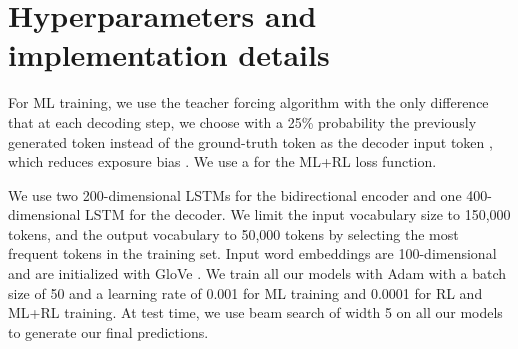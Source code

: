 \documentclass{article} \usepackage{iclr2018_arxiv,times}
\begin{document}
\section{Hyperparameters and implementation details}

For ML training, we use the teacher forcing algorithm with the only difference that at each decoding step, we choose with a 25\% probability the previously generated token instead of the ground-truth token as the decoder input token , which reduces exposure bias \citep{venkatraman2015}. We use a  for the ML+RL loss function.

We use two 200-dimensional LSTMs for the bidirectional encoder and one 400-dimensional LSTM for the decoder. We limit the input vocabulary size to 150,000 tokens, and the output vocabulary to 50,000 tokens by selecting the most frequent tokens in the training set. Input word embeddings are 100-dimensional and are initialized with GloVe \citep{pennington2014}. We train all our models with Adam \citep{kingma2014} with a batch size of 50 and a learning rate  of 0.001 for ML training and 0.0001 for RL and ML+RL training. At test time, we use beam search of width 5 on all our models to generate our final predictions.
\end{document}
